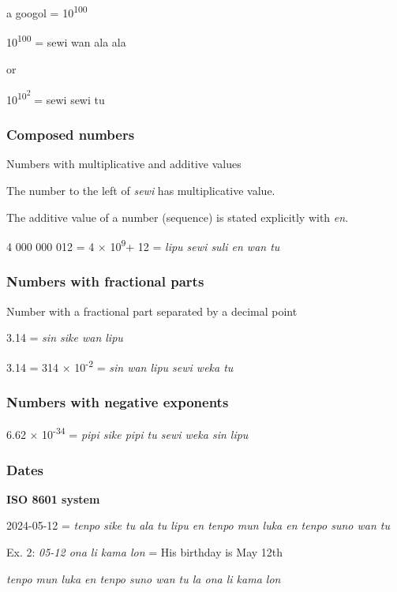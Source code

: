 \documentclass{article}
\begin{document}
	a googol = 10\textsuperscript{100}
	
    \vspace {6 pt}
	
	10\textsuperscript{100} = sewi wan ala ala
	
	or
	
	10\textsuperscript{10\textsuperscript{2}} = sewi sewi tu
	
	\subsubsection{Composed numbers}
	
	Numbers with multiplicative and additive values
	
	The number to the left of \emph{sewi} has multiplicative value.
	
	The additive value of a number (sequence) is stated explicitly with
	\emph{en}.
   \vspace {6 pt}
   	
	4 000 000 012 = 4 × 10\textsuperscript{9}+ 12 = \emph{lipu sewi suli en
		wan tu}
	
	\subsubsection{Numbers with fractional parts}
	
	Number with a fractional part separated by a decimal point
	
	3.14 = \emph{sin sike wan lipu}
	
	3.14 = 314 × 10\textsuperscript{-2} = \emph{sin wan lipu sewi weka tu}
	
	\subsubsection{Numbers with negative exponents}
	
	6.62 × 10\textsuperscript{-34} = \emph{pipi sike pipi tu sewi weka sin
		lipu}
	
	\subsubsection{Dates}
	
	\textbf{ISO 8601 system}
	
	
	2024-05-12 = \emph{tenpo sike tu ala tu lipu en tenpo mun luka en tenpo
		suno wan tu}
	
	Ex. 2: \emph{05-12 ona li kama lon} = His birthday is May 12th
	
	\emph{tenpo mun luka en tenpo suno wan tu la ona li kama lon}

	
\end{document}
